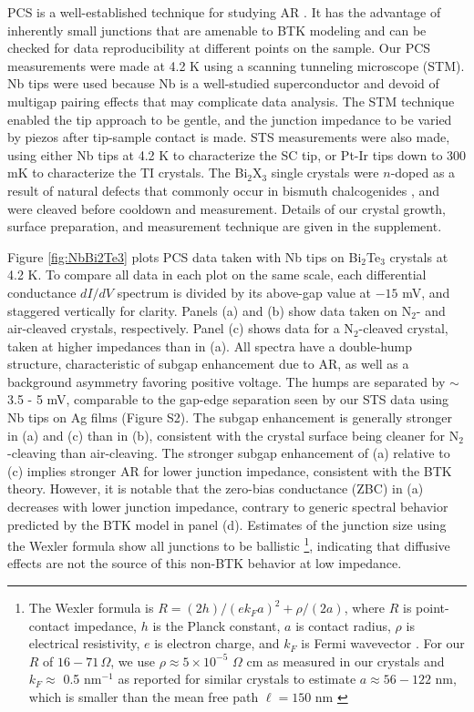 \documentclass[aps,prl,twocolumn,showpacs,amsmath,amssymb,superscriptaddress,citeautoscript]{revtex4-1}
\begin{document}
PCS is a well-established technique for studying AR \cite{Nadgorny2011}.  It has the advantage of inherently small junctions that are amenable to BTK modeling and can be checked for data reproducibility at different points on the sample. Our PCS measurements were made at 4.2 K using a scanning tunneling microscope (STM).  Nb tips were used because Nb is a well-studied superconductor and devoid of multigap pairing effects that may complicate data analysis.  The STM technique enabled the tip approach to be gentle, and the junction impedance to be varied by piezos after tip-sample contact is made. STS measurements were also made, using either Nb tips at 4.2 K to characterize the SC tip, or Pt-Ir tips down to 300 mK to characterize the TI crystals. The Bi$_{2}$X$_{3}$ single crystals were $n$-doped as a result of natural defects that commonly occur in bismuth chalcogenides \cite{Ando2013}, and were cleaved before cooldown and measurement. Details of our crystal growth, surface preparation, and measurement technique are given in the supplement.

Figure \ref{fig:NbBi2Te3} plots PCS data taken with Nb tips on Bi$_{2}$Te$_{3}$ crystals at 4.2 K. To compare all data in each plot on the same scale, each differential conductance $dI/dV$ spectrum is divided by its above-gap value at $- 15$ mV, and staggered vertically for clarity. Panels (a) and (b) show data taken on N$_2$- and air-cleaved crystals, respectively.  Panel (c) shows data for a N$_2$-cleaved crystal, taken at higher impedances than in (a).  All spectra have a double-hump structure, characteristic of subgap enhancement due to AR, as well as a background asymmetry favoring positive voltage. The humps are separated by $\sim$ 3.5 - 5 mV, comparable to the gap-edge separation seen by our STS data using Nb tips on Ag films (Figure S2). The subgap enhancement is generally stronger in (a) and (c) than in (b), consistent with the crystal surface being cleaner for N$_2$-cleaving than air-cleaving.  The stronger subgap enhancement of (a) relative to (c) implies stronger AR for lower junction impedance, consistent with the BTK theory.  However, it is notable that the zero-bias conductance (ZBC) in (a) decreases with lower junction impedance, contrary to generic spectral behavior predicted by the BTK model in panel (d).  Estimates of the junction size using the Wexler formula show all junctions to be ballistic \footnote{The Wexler formula is $R = \left(2 h\right)/\left(ek_{F}a\right)^2+\rho/\left(2a\right)$, where $R$ is point-contact impedance, $h$ is the Planck constant, $a$ is contact radius, $\rho$ is electrical resistivity, $e$ is electron charge, and $k_{F}$ is Fermi wavevector \cite{Wexler1966}. For our $R$ of $16-71\,\Omega$, we use $\rho \approx 5 \times10^{-5}$ $\Omega\,\mathrm{\,cm}$ as measured in our crystals and $k_{F} \approx $ 0.5 nm$^{-1}$ as reported for similar crystals \cite{Koehler1976,Qu2010} to estimate $a\approx 56-122$ nm, which is smaller than the mean free path $\ell=150$ nm \cite{Qu2010}}, indicating that diffusive effects are not the source of this non-BTK behavior at low impedance.
\end{document}
